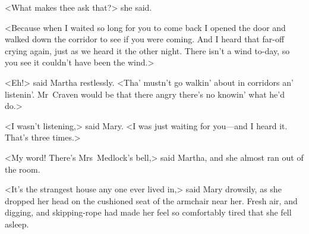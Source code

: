 <What makes thee ask that?> she said.

<Because when I waited so long for you to come back I opened the door and walked down the corridor to see if you were coming. And I heard that far-off crying again, just as we heard it the other night. There isn't a wind to-day, so you see it couldn't have been the wind.>

<Eh!> said Martha restlessly. <Tha' mustn't go walkin' about in corridors an' listenin'. Mr~Craven would be that there angry there's no knowin' what he'd do.>

<I wasn't listening,> said Mary. <I was just waiting for you—and I heard it. That's three times.>

<My word! There's Mrs~Medlock's bell,> said Martha, and she almost ran out of the room.

<It's the strangest house any one ever lived in,> said Mary drowsily, as she dropped her head on the cushioned seat of the armchair near her. Fresh air, and digging, and skipping-rope had made her feel so comfortably tired that she fell asleep.